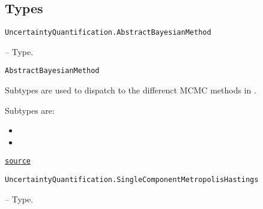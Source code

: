 \subsection{Types}



\label{12125088992129103176}{}

\hypertarget{8639565537460690979}{\texttt{UncertaintyQuantification.AbstractBayesianMethod}}  -- {Type.}

\begin{adjustwidth}{2em}{0pt}


\begin{verbatim}
AbstractBayesianMethod
\end{verbatim}

Subtypes are used to dispatch to the differenct MCMC methods in .

Subtypes are:

\begin{itemize}
\item {}


\item {}

\end{itemize}


\href{https://github.com/friesischscott/UncertaintyQuantification.jl/blob/f5ee6cce729f0d6a57979257379c942cdf42f86f/src/UncertaintyQuantification.jl#L47-L56}{\texttt{source}}


\end{adjustwidth}
\hypertarget{17074782294394699701}{\texttt{UncertaintyQuantification.SingleComponentMetropolisHastings}}  -- {Type.}

